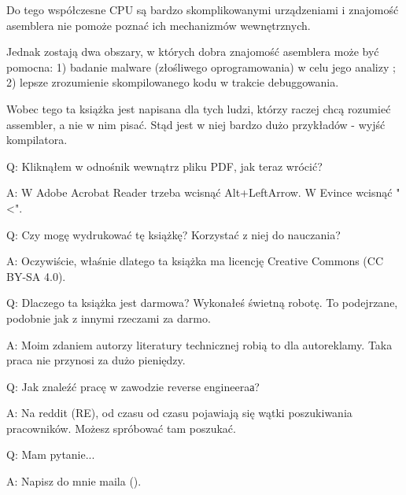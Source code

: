 Do tego współczesne \ac{CPU} są bardzo skomplikowanymi urządzeniami i znajomość asemblera nie pomoże poznać ich mechanizmów wewnętrznych.

Jednak zostają dwa obszary, w których dobra znajomość asemblera może być pomocna:
1) badanie malware (złośliwego oprogramowania) w celu jego analizy ; 2) lepsze zrozumienie skompilowanego kodu w trakcie debuggowania.

Wobec tego ta książka jest napisana dla tych ludzi, którzy raczej chcą rozumieć assembler, a nie w nim pisać. Stąd jest w niej bardzo dużo przykładów - wyjść kompilatora.

\par Q: Kliknąłem w odnośnik wewnątrz pliku PDF, jak teraz wrócić?
\par A: W Adobe Acrobat Reader trzeba wcisnąć Alt+LeftArrow. W Evince wcisnąć "<".

\par Q: Czy mogę wydrukować tę książkę? Korzystać z niej do nauczania?
\par A: Oczywiście, właśnie dlatego ta książka ma licencję Creative Commons (CC BY-SA 4.0).

\par Q: Dlaczego ta książka jest darmowa? Wykonałeś świetną robotę. To podejrzane, podobnie jak z innymi rzeczami za darmo.
\par A: Moim zdaniem autorzy literatury technicznej robią to dla autoreklamy. Taka praca nie przynosi za dużo pieniędzy.

\par Q: Jak znaleźć pracę w zawodzie reverse engineeraа?
\par A: Na reddit (RE\FNURLREDDIT), od czasu od czasu pojawiają się wątki poszukiwania pracowników.
Możesz spróbować tam poszukać.

\par Q: Mam pytanie...
\par A: Napisz do mnie maila (\EMAILS).

